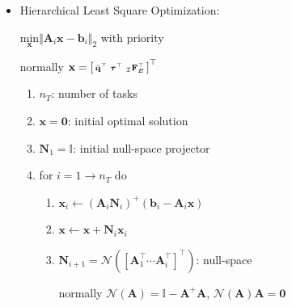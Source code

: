 \documentclass[landscape,a0paper,fontscale=0.285]{baposter} %
\newcommand{\compresslist}{ %
\setlength{\itemsep}{1pt}
\setlength{\parskip}{0pt}
\setlength{\parsep}{0pt}
}
\renewenvironment{bmatrix}{\left[\begin{smallmatrix}}{\end{smallmatrix}\right]}
\begin{document}
\begin{poster}
{\begin{itemize}\compresslist
    \item Hierarchical Least Square Optimization: 

    $\underset{\mathbf{x}}{\text{min}}\Vert \mathbf{A}_i\mathbf{x} - \mathbf{b}_i\Vert_2$ with priority

    normally $\textbf x = \begin{bmatrix}\ddot {\textbf q}^\top &\boldsymbol\tau^\top & _{\mathcal I}\textbf F_E^\top\end{bmatrix}^\top$
      \begin{enumerate}\compresslist
        \item $n_T$: number of tasks
        \item $\mathbf{x} = \mathbf{0}$: initial optimal solution
        \item $\mathbf{N}_1 = \mathbb{I}$: initial null-space projector
        \item for $i=1 \to n_T$ do
          \begin{enumerate}\compresslist
            \item $\mathbf{x}_i \gets (\mathbf{A}_i\mathbf{N}_i)^+(\mathbf{b}_i-\mathbf{A}_i\mathbf{x})$
            \item $\mathbf{x} \gets \mathbf{x} +  \mathbf{N}_i\mathbf{x}_i$
            \item $\mathbf{N}_{i+1} = \mathcal{N}(\left[\mathbf{A}_1^\top \cdots \mathbf{A}_i^\top\right]^\top)$: null-space
            
            \hspace{-10pt}normally $\mathcal{N}(\mathbf{A}) = \mathbb{I} - \mathbf{A}^+ \mathbf{A}$, $\mathcal{N}(\mathbf{A})\mathbf{A} = \mathbf{0}$
          \end{enumerate}
      \end{enumerate}
\end{itemize}

}

\end{poster}
\end{document}
